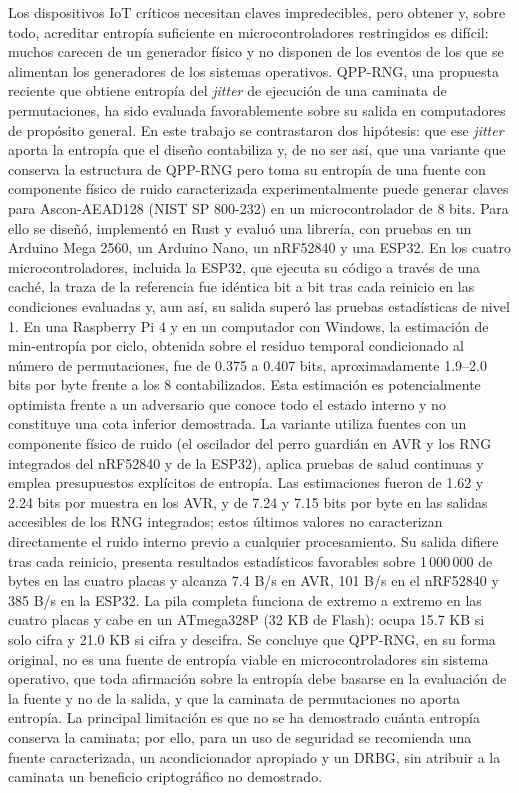 \documentclass{plantilla-uniandes}
\begin{document}
Los dispositivos IoT críticos necesitan claves impredecibles, pero obtener y, sobre todo, acreditar entropía suficiente en microcontroladores restringidos es difícil: muchos carecen de un generador físico y no disponen de los eventos de los que se alimentan los generadores de los sistemas operativos. QPP-RNG, una propuesta reciente que obtiene entropía del \textit{jitter} de ejecución de una caminata de permutaciones, ha sido evaluada favorablemente sobre su salida en computadores de propósito general. En este trabajo se contrastaron dos hipótesis: que ese \textit{jitter} aporta la entropía que el diseño contabiliza y, de no ser así, que una variante que conserva la estructura de QPP-RNG pero toma su entropía de una fuente con componente físico de ruido caracterizada experimentalmente puede generar claves para Ascon-AEAD128 (NIST SP 800-232) en un microcontrolador de 8 bits. Para ello se diseñó, implementó en Rust y evaluó una librería, con pruebas en un Arduino Mega 2560, un Arduino Nano, un nRF52840 y una ESP32. En los cuatro microcontroladores, incluida la ESP32, que ejecuta su código a través de una caché, la traza de la referencia fue idéntica bit a bit tras cada reinicio en las condiciones evaluadas y, aun así, su salida superó las pruebas estadísticas de nivel 1. En una Raspberry Pi 4 y en un computador con Windows, la estimación de min-entropía por ciclo, obtenida sobre el residuo temporal condicionado al número de permutaciones, fue de 0.375 a 0.407 bits, aproximadamente 1.9--2.0 bits por byte frente a los 8 contabilizados. Esta estimación es potencialmente optimista frente a un adversario que conoce todo el estado interno y no constituye una cota inferior demostrada. La variante utiliza fuentes con un componente físico de ruido (el oscilador del perro guardián en AVR y los RNG integrados del nRF52840 y de la ESP32), aplica pruebas de salud continuas y emplea presupuestos explícitos de entropía. Las estimaciones fueron de 1.62 y 2.24 bits por muestra en los AVR, y de 7.24 y 7.15 bits por byte en las salidas accesibles de los RNG integrados; estos últimos valores no caracterizan directamente el ruido interno previo a cualquier procesamiento. Su salida difiere tras cada reinicio, presenta resultados estadísticos favorables sobre 1\,000\,000 de bytes en las cuatro placas y alcanza 7.4 B/s en AVR, 101 B/s en el nRF52840 y 385 B/s en la ESP32. La pila completa funciona de extremo a extremo en las cuatro placas y cabe en un ATmega328P (32 KB de Flash): ocupa 15.7 KB si solo cifra y 21.0 KB si cifra y descifra. Se concluye que QPP-RNG, en su forma original, no es una fuente de entropía viable en microcontroladores sin sistema operativo, que toda afirmación sobre la entropía debe basarse en la evaluación de la fuente y no de la salida, y que la caminata de permutaciones no aporta entropía. La principal limitación es que no se ha demostrado cuánta entropía conserva la caminata; por ello, para un uso de seguridad se recomienda una fuente caracterizada, un acondicionador apropiado y un DRBG, sin atribuir a la caminata un beneficio criptográfico no demostrado.
\end{document}
